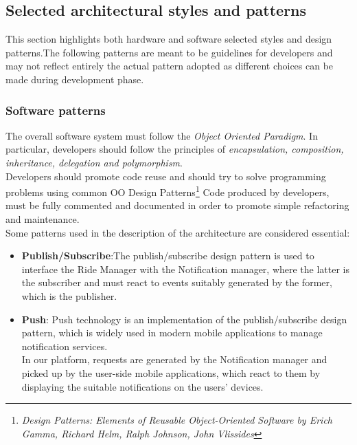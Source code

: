 \subsection{Selected architectural styles and patterns}
This section highlights both hardware and software selected styles and design
patterns.The following patterns are meant to be guidelines for developers and may not reflect entirely the actual pattern adopted as different choices can be made during development phase.\\
\subsubsection{Software patterns}
The overall software system must follow the \emph{Object Oriented Paradigm}.
In particular, developers should follow the principles of \emph{encapsulation, composition, inheritance, delegation and polymorphism}.\\
Developers should promote code reuse and should try to solve programming
problems using common OO Design Patterns\footnote{\emph{Design Patterns: Elements of Reusable Object-Oriented Software by Erich
Gamma, Richard Helm, Ralph Johnson, John Vlissides}}
Code produced by developers, must be fully commented and documented in
order to promote simple refactoring and maintenance.\\
Some patterns used in the description of the architecture are considered essential:
\begin{itemize}
\item \textbf{Publish/Subscribe}:The publish/subscribe design pattern is used to interface the Ride Manager with the Notification manager, where the latter is the
subscriber and must react to events suitably generated by the former, which is
the publisher.
\item \textbf{Push}: Push technology is an implementation of the publish/subscribe design pattern, which is widely used in modern mobile applications to manage notification services.\\
In our platform, requests are generated by the Notification manager and
picked up by the user-side mobile applications, which react to them by displaying
the suitable notifications on the users’ devices.
\end{itemize}
